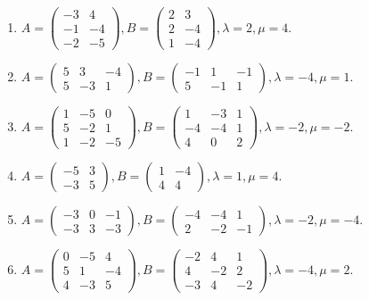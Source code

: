\begin{enumerate}[label=\arabic*.,]
\item $A = \begin{pmatrix} -3 & 4 \\ -1 & -4 \\ -2 & -5 \end{pmatrix},  B = \begin{pmatrix} 2 & 3 \\ 2 & -4 \\ 1 & -4 \end{pmatrix},  \lambda = 2,  \mu = 4$.
\item $A = \begin{pmatrix} 5 & 3 & -4 \\ 5 & -3 & 1 \end{pmatrix},  B = \begin{pmatrix} -1 & 1 & -1 \\ 5 & -1 & 1 \end{pmatrix},  \lambda = -4,  \mu = 1$.
\item $A = \begin{pmatrix} 1 & -5 & 0 \\ 5 & -2 & 1 \\ 1 & -2 & -5 \end{pmatrix},  B = \begin{pmatrix} 1 & -3 & 1 \\ -4 & -4 & 1 \\ 4 & 0 & 2 \end{pmatrix},  \lambda = -2,  \mu = -2$.
\item $A = \begin{pmatrix} -5 & 3 \\ -3 & 5 \end{pmatrix},  B = \begin{pmatrix} 1 & -4 \\ 4 & 4 \end{pmatrix},  \lambda = 1,  \mu = 4$.
\item $A = \begin{pmatrix} -3 & 0 & -1 \\ -3 & 3 & -3 \end{pmatrix},  B = \begin{pmatrix} -4 & -4 & 1 \\ 2 & -2 & -1 \end{pmatrix},  \lambda = -2,  \mu = -4$.
\item $A = \begin{pmatrix} 0 & -5 & 4 \\ 5 & 1 & -4 \\ 4 & -3 & 5 \end{pmatrix},  B = \begin{pmatrix} -2 & 4 & 1 \\ 4 & -2 & 2 \\ -3 & 4 & -2 \end{pmatrix},  \lambda = -4,  \mu = 2$.

\end{enumerate}
